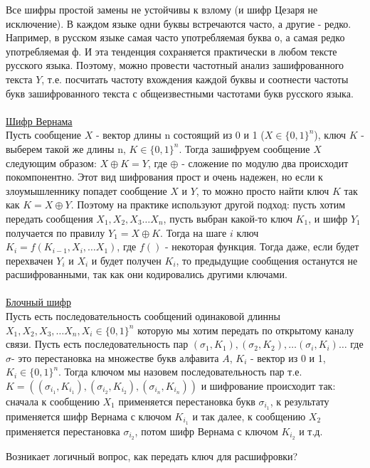 Все шифры простой замены не устойчивы к взлому (и шифр Цезаря не исключение). В каждом языке одни буквы встречаются часто, а другие - редко. Например, в русском языке самая часто употребляемая буква о, а самая редко употребляемая ф. И эта тенденция сохраняется практически в любом тексте русского языка. Поэтому, можно провести частотный анализ зашифрованного текста $Y$, т.е. посчитать частоту вхождения каждой буквы и соотнести частоты букв зашифрованного текста с общеизвестными частотами букв русского языка.\\
\\
\href{https://clck.ru/TQFhp}{Шифр Вернама} \\
Пусть сообщение $X$ - вектор длины n состоящий из 0 и 1 ($X \in \{0, 1\}^n$), ключ $K$ - выберем такой же длины n, $K \in \{0, 1\}^n$. Тогда зашифруем сообщение $X$ следующим образом: $X \oplus K = Y$, где $\oplus$ - сложение по модулю два происходит покомпонентно. Этот вид шифрования прост и очень надежен, но если к злоумышленнику попадет сообщение $X$ и $Y$, то можно просто найти ключ $K$ так как $K = X \oplus Y$. Поэтому на практике используют другой подход: пусть хотим передать сообщения $X_1, X_2, X_3 \dots X_n$, пусть выбран какой-то ключ $K_1$, и шифр $Y_1$ получается по правилу $Y_1 = X \oplus K$. Тогда на шаге $i$ ключ $K_i = f (K_{i - 1}, X_i, \dots X_1)$, где $f()$ - некоторая функция. Тогда даже, если будет перехвачен $Y_i$ и $X_i$ и будет получен $K_i$, то предыдущие сообщения останутся не расшифрованными, так как они кодировались другими ключами. \\
\\
\href{https://clck.ru/UNdXg}{Блочный шифр} \\
Пусть есть последовательность сообщений одинаковой длинны $X_1, X_2, X_3, \dots X_n, X_i \in \{0, 1\}^n$ которую мы хотим передать по открытому каналу связи. Пусть есть последовательность пар $(\sigma_1, K_1), (\sigma_2, K_2), \dots (\sigma_i, K_i) \dots$ где $\sigma$- это перестановка на множестве букв алфавита $A$, $K_i$ - вектор из 0 и 1, $K_i \in \{0, 1\}^n$. Тогда ключом мы назовем последовательность пар т.е. $K = ((\sigma_{i_1}, K_{i_1}), (\sigma_{i_2}, K_{i_2}), (\sigma_{i_n}, K_{i_n}))$ и шифрование происходит так: сначала к сообщению $X_1$ применяется перестановка букв $\sigma_{i_1}$, к результату применяется шифр Вернама с ключом $K_{i_1}$ и так далее, к сообщению $X_2$ применяется перестановка $\sigma_{i_2}$, потом шифр Вернама с ключом $K_{i_2}$ и т.д.

Возникает логичный вопрос, как передать ключ для расшифровки? \\

